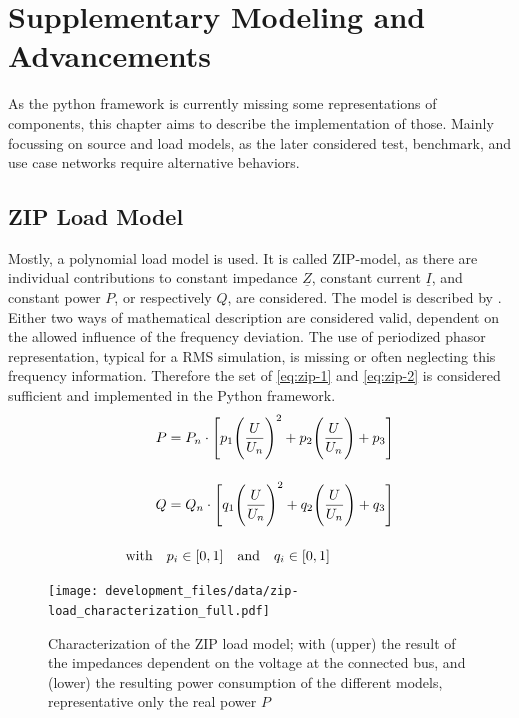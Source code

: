 \section{Supplementary Modeling and Advancements}

As the python framework is currently missing some representations of components, this chapter aims to describe the implementation of those. Mainly focussing on source and load models, as the later considered test, benchmark, and use case networks require alternative behaviors. 

\subsection{ZIP Load Model}


Mostly, a polynomial load model is used. It is called ZIP-model, as there are individual contributions to constant impedance $\underline{Z}$, constant current $\underline{I}$, and constant power $P$, or respectively $Q$, are considered. The model is described by \textcite{IEEEGuideLoad2022}. Either two ways of mathematical description are considered valid, dependent on the allowed influence of the frequency deviation. The use of periodized phasor representation, typical for a \acs{RMS} simulation, is missing or often neglecting this frequency information. Therefore the set of \autoref{eq:zip-1} and \autoref{eq:zip-2} is considered sufficient and implemented in the Python framework.
\begin{align}
        P&=P_n \cdot \Bigg[ p_1 \Bigg(\frac{U}{U_n}\Bigg)^2 + p_2 \Bigg(\frac{U}{U_n}\Bigg) + p_3 \Bigg] \label{eq:zip-1} \\[12pt]
        Q&=Q_n \cdot \Bigg[ q_1 \Bigg(\frac{U}{U_n}\Bigg)^2 + q_2 \Bigg(\frac{U}{U_n}\Bigg) + q_3 \Bigg] \label{eq:zip-2} \\[12pt]
        \text{with} \quad &p_i \in [0,1] \quad \text{and} \quad q_i \in [0,1] \notag
\end{align}


\begin{figure}[htb!]
        \centering
        \texttt{[image: development\_files/data/zip-load\_characterization\_full.pdf]}
        \caption[Characterization of the ZIP load model]{Characterization of the ZIP load model; with (upper) the result of the impedances dependent on the voltage at the connected bus, and (lower) the resulting power consumption of the different models, representative only the real power $P$}
        \label{fig:zip-charac}
\end{figure}

